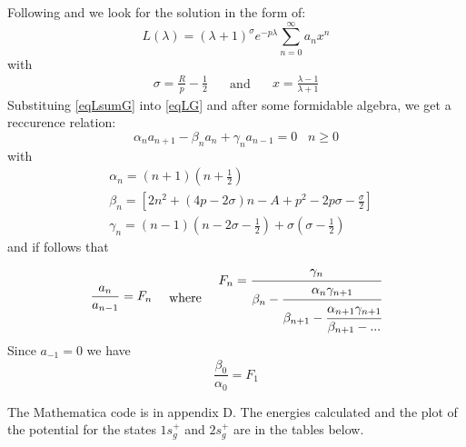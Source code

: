 Following \cite{Bates1} and \cite{H2Plus2d2} we look for the solution in the form of:
\begin{equation}\label{eqLsumG}
L(\lambda) = \left(\lambda +1\right)^\sigma e^{-p\lambda}\sum_{n=0}^{\infty}{a_nx^n}
\end{equation}
with
\begin{equation}
\begin{split}
\sigma = \frac{R}{p} - \frac{1}{2}
\end{split}
\quad\text{ and }\quad
\begin{split}
x = \frac{\lambda-1}{\lambda+1}
\end{split}
\end{equation}
Substituing \eqref{eqLsumG} into \eqref{eqLG} and after some formidable algebra, we get a reccurence relation:
\begin{equation}
\alpha_na_{n+1}-\beta_n a_n+\gamma_na_{n-1} = 0\,\,\,\,\,n \ge 0
\end{equation}
with
\begin{equation}
\begin{split}
& \alpha_n = \left(n + 1\right)\left(n + \frac{1}{2}\right)\\[.8em]
& \beta_n = \left[2n^2 + (4p - 2\sigma)n - A + p^2 - 2p\sigma - \frac{\sigma}{2}\right] \\[.8em]
& \gamma_n = (n-1)\left(n - 2\sigma - \frac{1}{2}\right) + \sigma\left(\sigma - \frac{1}{2}\right)
\end{split}
\end{equation}
and if follows that
\begin{equation}
\begin{split}
\frac{a_n}{a_{n-1}} = F_n
\end{split}
\quad\text{ where }\quad
\begin{split}
F_n = \cfrac{\gamma_n}{\beta_n - \cfrac{\alpha_n \gamma_{n+1}}{\beta_{n+1}-\cfrac{\alpha_{n+1}\gamma_{n+1}}{\beta_{n+1}-\text{...}}}}
\end{split}
\end{equation}
Since $ a_{-1} = 0$ we have
\begin{equation}
\frac{\beta_0}{\alpha_0} = F_1
\end{equation}

The Mathematica code is in appendix D. The energies calculated and the plot of the potential for the states $1s_g^{+}$ and $ 2s_g^{+} $ are in the tables below.

